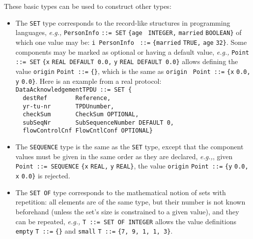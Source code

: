 \noindent
These basic types can be used to construct other types:

\begin{itemize}

  \item The \texttt{\small SET} type corresponds to the record-like
        structures in programming languages, \emph{e.g.,} \texttt{PersonInfo}
        \texttt{\small ::= SET} \verb+{+\texttt{age} \texttt{\small
        INTEGER,} \texttt{married} \texttt{\small BOOLEAN}\verb+}+ of
        which one value may be: \texttt{i PersonInfo} \texttt{\small
        ::=} \verb+{+\texttt{married} \texttt{\small TRUE,} \texttt{age}
        \texttt{\small 32}\verb+}+. Some components may be marked as
        optional or having a default value, \emph{e.g.,} \texttt{\small Point
        ::= SET} \verb+{+\texttt{x} \texttt{\small REAL DEFAULT 0.0,}
        \texttt{y} \texttt{\small REAL DEFAULT 0.0}\verb+}+ allows
        defining the value \texttt{origin} \texttt{\small Point ::=}
        \verb+{}+, which is the same as \texttt{origin} \texttt{\small
        Point ::=} \verb+{+\texttt{x} \texttt{\small 0.0,} \texttt{y}
        \texttt{\small 0.0}\verb+}+. Here is an example from a real
        protocol:\\
{\small
\verb+DataAcknowledgementTPDU ::= SET {+\\
\verb+  destRef        Reference,+\\
\verb+  yr-tu-nr       TPDUnumber,+\\
\verb+  checkSum       CheckSum OPTIONAL,+\\
\verb+  subSeqNr       SubSequenceNumber DEFAULT 0,+\\
\verb+  flowControlCnf FlowCntlConf OPTIONAL}+}

  \item The \texttt{\small SEQUENCE} type is the same as the
        \texttt{\small SET} type, except that the component values
        must be given in the same order as they are declared, \emph{e.g.,},
        given \texttt{\small Point ::= SEQUENCE} \verb+{+\texttt{x}
        \texttt{\small REAL,} \texttt{y} \texttt{\small REAL}\verb+}+,
        the value \texttt{origin} \texttt{\small Point ::=}
        \verb+{+\texttt{y} \texttt{\small 0.0,} \texttt{x}
        \texttt{\small 0.0}\verb+}+ is rejected.

  \item The \texttt{\small SET OF} type corresponds to the
    mathematical notion of sets with repetition: all elements are of
    the same type, but their number is not known beforehand (unless
    the set's size is constrained to a given value), and they can be
    repeated, \emph{e.g.,} \texttt{\small T ::= SET OF INTEGER} allows
    the value definitions \texttt{empty} \texttt{\small T ::=}
    \verb+{}+ and \texttt{small} \texttt{\small T ::=}
    \verb+{+\texttt{\small 7, 9, 1, 1, 3}\verb+}+.
 

\end{itemize}
